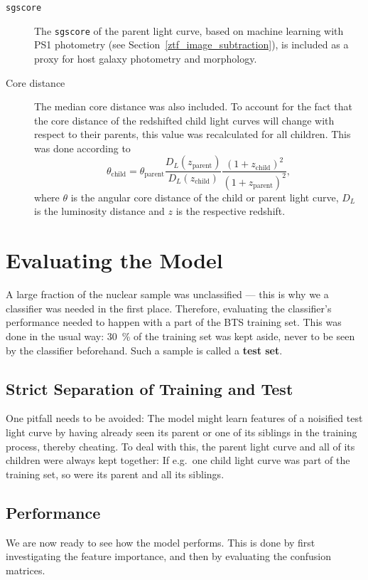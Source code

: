 \begin{description}
    \item[\texttt{sgscore}] The \texttt{sgscore} of the parent light curve, based on machine learning with PS1 photometry (see Section~\ref{ztf_image_subtraction}), is included as a proxy for host galaxy photometry and morphology.
    \item[Core distance] The median core distance was also included. To account for the fact that the core distance of the redshifted child light curves will change with respect to their parents, this value was recalculated for all children. This was done according to
        \begin{equation}
            \theta_\text{child} = \theta_\text{parent} \frac{D_L(z_\text{parent})}{D_L(z_\text{child})} \frac{(1+z_\text{child})^2}{(1+z_\text{parent})^2},
        \end{equation}
        where $\theta$ is the angular core distance of the child or parent light curve, $D_L$ is the luminosity distance and $z$ is the respective redshift.
\end{description}

\section{Evaluating the Model}
A large fraction of the nuclear sample was unclassified --- this is why we a classifier was needed in the first place. Therefore, evaluating the classifier's performance needed to happen with a part of the BTS training set. This was done in the usual way: \SI{30}{\percent} of the training set was kept aside, never to be seen by the classifier beforehand. Such a sample is called a \textbf{test set}.

\subsection{Strict Separation of Training and Test}
One pitfall needs to be avoided: The model might learn features of a noisified test light curve by having already seen its parent or one of its siblings in the training process, thereby cheating. To deal with this, the parent light curve and all of its children were always kept together: If e.g.~one child light curve was part of the training set, so were its parent and all its siblings.

\subsection{Performance}
We are now ready to see how the model performs. This is done by first investigating the feature importance, and then by evaluating the confusion matrices.

